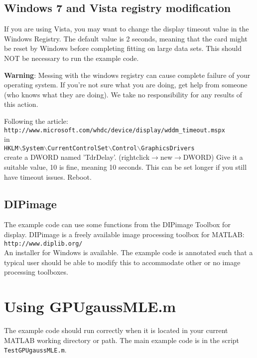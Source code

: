 \documentclass[11pt,letterpaper]{article}
\begin{document}
\subsection{Windows 7 and Vista registry modification}
If you are using Vista, you may want to change the display timeout value in the Windows Registry. The default value is 2 seconds, meaning that the card might be reset by Windows before completing fitting on large data sets. This should NOT be necessary to run the example code.

\textbf{Warning}: Messing with the windows registry can cause complete failure of your operating system. If you're not sure what you are doing, get help from someone (who knows what they are doing). We take no responsibility for any results of this action. 

\pagebreak
Following the article:\\
{\tt http://www.microsoft.com/whdc/device/display/wddm\_timeout.mspx}\\
in \\
{\tt HKLM$\backslash$System$\backslash$CurrentControlSet$\backslash$Control$\backslash$GraphicsDrivers}\\
 create a DWORD named 'TdrDelay'. (rightclick$\rightarrow$new$\rightarrow$DWORD) Give it a suitable value, 10 is fine, meaning 10 seconds. This can be set longer if you still have timeout issues. Reboot.

\subsection{DIPimage}
The example code can use some functions from the DIPimage Toolbox for display. DIPimage is a freely available image processing toolbox for MATLAB:\\
{\tt http://www.diplib.org/}\\
An installer for Windows is available.  The example code is annotated such that a typical user should be able to modify this to accommodate other or no image processing toolboxes.

\section{Using GPUgaussMLE.m}
The example code should run correctly when it is located in your current MATLAB working directory or path. The main example code is in the script {\tt TestGPUgaussMLE.m}.
\end{document}
